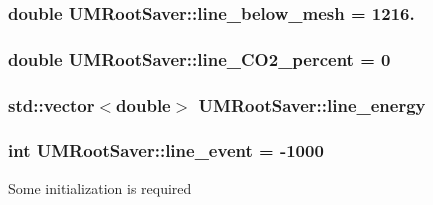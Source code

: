 \subsubsection[{line\+\_\+below\+\_\+mesh}]{\setlength{\rightskip}{0pt plus 5cm}double U\+M\+Root\+Saver\+::line\+\_\+below\+\_\+mesh = 1216.\hspace{0.3cm}{\ttfamily [private]}}\label{classUMRootSaver_a3eaefa9c88dfb35ad31f9cbe696deb5d}
\hypertarget{classUMRootSaver_a9250e9ecd6587858b397a35bb55a7889}{}
\subsubsection[{line\+\_\+\+C\+O2\+\_\+percent}]{\setlength{\rightskip}{0pt plus 5cm}double U\+M\+Root\+Saver\+::line\+\_\+\+C\+O2\+\_\+percent = 0\hspace{0.3cm}{\ttfamily [private]}}\label{classUMRootSaver_a9250e9ecd6587858b397a35bb55a7889}
\hypertarget{classUMRootSaver_a3306ae5496af585da4cfcb7b814add17}{}
\subsubsection[{line\+\_\+energy}]{\setlength{\rightskip}{0pt plus 5cm}std\+::vector$<$double$>$ U\+M\+Root\+Saver\+::line\+\_\+energy\hspace{0.3cm}{\ttfamily [private]}}\label{classUMRootSaver_a3306ae5496af585da4cfcb7b814add17}
\hypertarget{classUMRootSaver_aa2a036666d57184757bf92a30fa92a01}{}
\subsubsection[{line\+\_\+event}]{\setlength{\rightskip}{0pt plus 5cm}int U\+M\+Root\+Saver\+::line\+\_\+event = -\/1000\hspace{0.3cm}{\ttfamily [private]}}\label{classUMRootSaver_aa2a036666d57184757bf92a30fa92a01}
Some initialization is required \hypertarget{classUMRootSaver_a1fa4a2ba095c5dcc794de33f25a42e35}{}
